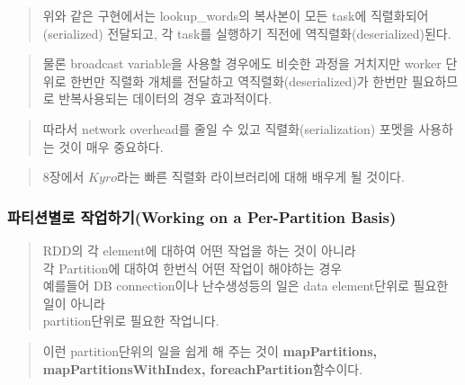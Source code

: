 \documentclass[11pt]{article}
\begin{document}
    \begin{quote}
위와 같은 구현에서는 lookup\_words의 복사본이 모든 task에
직렬화되어(serialized) 전달되고, 각 task를 실행하기 직전에
역직렬화(deserialized)된다.
\end{quote}

\begin{quote}
물론 broadcast variable을 사용할 경우에도 비슷한 과정을 거치지만 worker
단위로 한번만 직렬화 개체를 전달하고 역직렬화(deserialized)가 한번만
필요하므로 반복사용되는 데이터의 경우 효과적이다.
\end{quote}

\begin{quote}
따라서 network overhead를 줄일 수 있고 직렬화(serialization) 포멧을
사용하는 것이 매우 중요하다.
\end{quote}

\begin{quote}
8장에서 $Kyro$라는 빠른 직렬화 라이브러리에 대해 배우게 될 것이다.
\end{quote}

    \subsubsection{파티션별로 작업하기(Working on a Per-Partition
Basis)}\label{uxd30cuxd2f0uxc158uxbcc4uxb85c-uxc791uxc5c5uxd558uxae30working-on-a-per-partition-basis}

    \begin{quote}
RDD의 각 element에 대하여 어떤 작업을 하는 것이 아니라\\각 Partition에
대하여 한번식 어떤 작업이 해야하는 경우\\예를들어 DB connection이나
난수생성등의 일은 data element단위로 필요한 일이 아니라\\partition단위로
필요한 작업니다.
\end{quote}

\begin{quote}
이런 partition단위의 일을 쉽게 해 주는 것이 \textbf{mapPartitions,
mapPartitionsWithIndex, foreachPartition}함수이다.
\end{quote}
\end{document}
